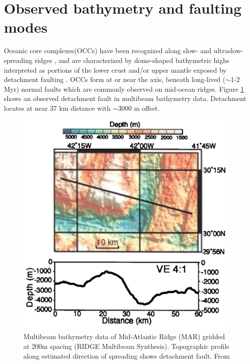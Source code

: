 \documentclass[letterpaper,12pt,notitle]{memphisthesis}                     %
\begin{document}

%
%
%

\section{Observed bathymetry and faulting modes}
Oceanic core complexes(OCCs) have been recognized along slow- and ultraslow- spreading ridges \citep{Tucholke1998}, and are characterized by dome-shaped bathymetric highs interpreted as portions of the lower crust and/or upper mantle exposed by detachment faulting \citep{Tucholke1994}. OCCs form at or near the axis, beneath long-lived ($\sim$1-2 Myr) normal faults which are commonly observed on mid-ocean ridges. Figure \ref{fig:occ} shows an observed detachment fault in multibeam bathymetry data. Detachment locates at near 37 km distance with $\sim$3000 m offset.
%
\begin{figure}[!htb]
	\centering
	\includegraphics[width=0.6\linewidth]{./figs/occ.png}
	\caption{Multibeam bathymetry data of Mid-Atlantic Ridge (MAR) gridded at 200m spacing (RIDGE Multibeam Synthesis). Topographic profile along estimated direction of spreading shows detachment fault. From \citet{Lavier2000}}
	\label{fig:occ}
\end{figure}
%
\end{document}
